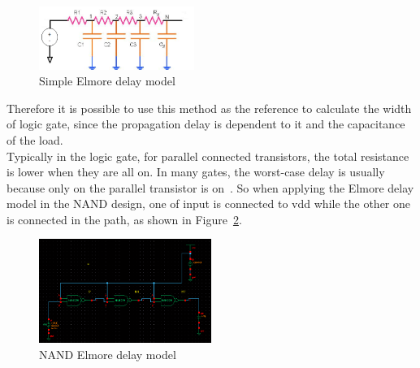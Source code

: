 \begin{figure}[H]
		\centering
		\includegraphics[width = 0.45\textwidth]{Figures/elmoredelaymodel}		
		\caption{Simple Elmore delay model}
		\label {fig:elmore}
\end{figure}
Therefore it is possible to use this method as the reference to calculate the width of logic gate, since the propagation delay is dependent to it and the capacitance of the load. \\
Typically in the logic gate, for parallel connected  transistors, the total resistance is lower when they are all on. In many gates, the worst-case delay is usually because only on the parallel transistor is on~\cite{[2]}. So when applying the Elmore delay model in the NAND design, one of input is connected to vdd while the other one is connected in the path, as shown in Figure~\ref{fig:nandtest}.
\begin{figure}[H]
		\centering
		\includegraphics[width = 0.5\textwidth]{Figures/nandtest}		
		\caption{NAND Elmore delay model}
		\label {fig:nandtest}
\end{figure}

